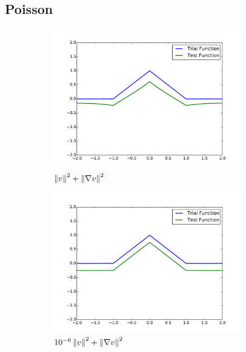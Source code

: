 \documentclass{article}
\begin{document}
\clearpage
\subsection*{Poisson}

\begin{figure}[ht]
\centering
\begin{subfigure}[t]{0.45\textwidth}
\centering
\includegraphics[width=0.9\textwidth]{OptimalTestFunctions/SpecialCases/PoissonH1NoBC.pdf}
\caption{$\left\| v \right\|^2+\left\| \nabla v \right\|^2$}
\end{subfigure}
\begin{subfigure}[t]{0.45\textwidth}
\centering
\includegraphics[width=0.9\textwidth]{OptimalTestFunctions/SpecialCases/Poisson1e-6NoBC.pdf}
\caption{$10^{-6}\left\| v \right\|^2+\left\| \nabla v \right\|^2$}
\end{subfigure}
\begin{subfigure}[t]{0.45\textwidth}

\end{subfigure}
\end{figure}
\end{document}
